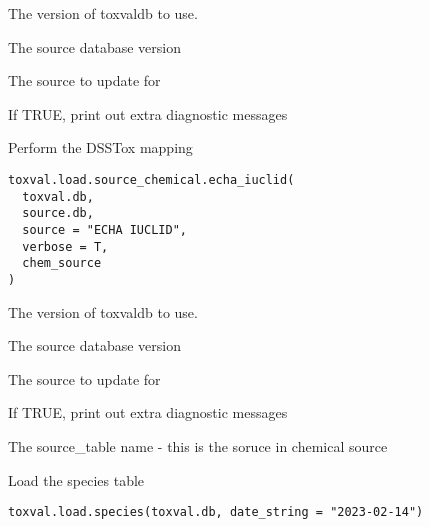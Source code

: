 \documentclass[letterpaper]{book}
\begin{document}
%
\begin{Arguments}
\begin{ldescription}
\item[\code{toxval.db}] The version of toxvaldb to use.

\item[\code{source.db}] The source database version

\item[\code{source}] The source to update for

\item[\code{verbose}] If TRUE, print out extra diagnostic messages
\end{ldescription}
\end{Arguments}
%
\begin{Description}\relax
Perform the DSSTox mapping
\end{Description}
%
\begin{Usage}
\begin{verbatim}
toxval.load.source_chemical.echa_iuclid(
  toxval.db,
  source.db,
  source = "ECHA IUCLID",
  verbose = T,
  chem_source
)
\end{verbatim}
\end{Usage}
%
\begin{Arguments}
\begin{ldescription}
\item[\code{toxval.db}] The version of toxvaldb to use.

\item[\code{source.db}] The source database version

\item[\code{source}] The source to update for

\item[\code{verbose}] If TRUE, print out extra diagnostic messages

\item[\code{chem\_source}] The source\_table name - this is the soruce in chemical source
\end{ldescription}
\end{Arguments}
%
\begin{Description}\relax
Load the species table
\end{Description}
%
\begin{Usage}
\begin{verbatim}
toxval.load.species(toxval.db, date_string = "2023-02-14")
\end{verbatim}
\end{Usage}
\end{document}
